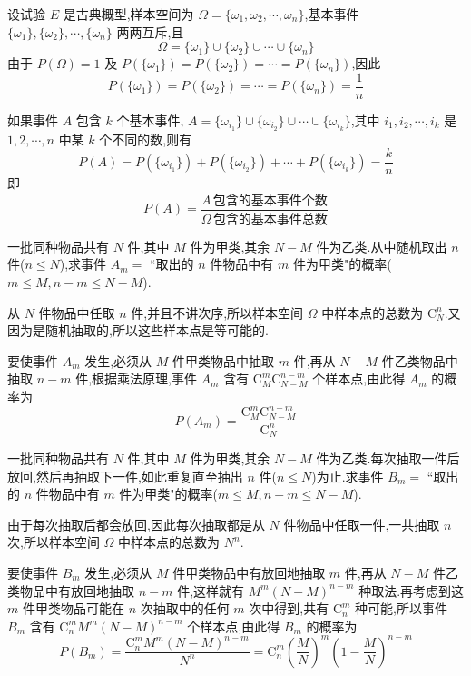 设试验 $E$ 是古典概型,样本空间为 $\varOmega = \{\omega_1,\omega_2,\cdots,\omega_n\}$,基本事件 $\{\omega_1\},\{\omega_2\},\cdots,\{\omega_n\}$ 两两互斥,且
$$
\varOmega = \{\omega_1\} \cup \{\omega_2\} \cup \cdots \cup \{\omega_n\}
$$
由于 $P(\varOmega)=1$ 及 $P(\{\omega_1\})=P(\{\omega_2\})=\cdots=P(\{\omega_n\})$,因此
$$
P(\{\omega_1\})=P(\{\omega_2\})=\cdots=P(\{\omega_n\})=\dfrac{1}{n}
$$

如果事件 $A$ 包含 $k$ 个基本事件, $A=\{\omega_{i_1}\} \cup \{\omega_{i_2}\} \cup \cdots \cup \{\omega_{i_k}\}$,其中 $i_1,i_2,\cdots,i_k$ 是 $1,2,\cdots,n$ 中某 $k$ 个不同的数,则有
$$
P(A) = P(\{\omega_{i_1}\}) + P(\{\omega_{i_2}\}) + \cdots + P(\{\omega_{i_k}\}) = \dfrac{k}{n}
$$
即
$$
P(A)=\dfrac{A\,\text{包含的基本事件个数}}{\varOmega\,\text{包含的基本事件总数}}
$$

\begin{example}[][不放回抽样]
    \indent 一批同种物品共有 $N$ 件,其中 $M$ 件为甲类,其余 $N-M$ 件为乙类.从中随机取出 $n$ 件($n \leqslant N$),求事件 $A_m=$ ``取出的 $n$ 件物品中有 $m$ 件为甲类"的概率($m \leqslant M, n-m \leqslant N-M$).
\end{example}

\begin{solution}
    从 $N$ 件物品中任取 $n$ 件,并且不讲次序,所以样本空间 $\varOmega$ 中样本点的总数为 $\mathrm{C}_N^n$.又因为是随机抽取的,所以这些样本点是等可能的.

    要使事件 $A_m$ 发生,必须从 $M$ 件甲类物品中抽取 $m$ 件,再从 $N-M$ 件乙类物品中抽取 $n-m$ 件,根据乘法原理,事件 $A_m$ 含有 $\mathrm{C}_M^m \mathrm{C}_{N-M}^{n-m}$ 个样本点,由此得 $A_m$ 的概率为
    $$
    P(A_m) = \dfrac{\mathrm{C}_M^m \mathrm{C}_{N-M}^{n-m}}{\mathrm{C}_N^n}
    $$
\end{solution}

\begin{example}[][放回抽样]
    \indent 一批同种物品共有 $N$ 件,其中 $M$ 件为甲类,其余 $N-M$ 件为乙类.每次抽取一件后放回,然后再抽取下一件,如此重复直至抽出 $n$ 件($n \leqslant N$)为止.求事件 $B_m=$ ``取出的 $n$ 件物品中有 $m$ 件为甲类"的概率($m \leqslant M, n-m \leqslant N-M$).
\end{example}

\begin{solution}
    由于每次抽取后都会放回,因此每次抽取都是从 $N$ 件物品中任取一件,一共抽取 $n$ 次,所以样本空间 $\varOmega$ 中样本点的总数为 $N^n$.

    要使事件 $B_m$ 发生,必须从 $M$ 件甲类物品中有放回地抽取 $m$ 件,再从 $N-M$ 件乙类物品中有放回地抽取 $n-m$ 件,这样就有 $M^m (N-M)^{n-m}$ 种取法.再考虑到这 $m$ 件甲类物品可能在 $n$ 次抽取中的任何 $m$ 次中得到,共有 $\mathrm{C}_n^m$ 种可能,所以事件 $B_m$ 含有 $\mathrm{C}_n^m M^m (N-M)^{n-m}$ 个样本点,由此得 $B_m$ 的概率为
    $$
    P(B_m) = \dfrac{\mathrm{C}_n^m M^m (N-M)^{n-m}}{N^n} = \mathrm{C}_n^m \left( \dfrac{M}{N} \right)^m \left( 1 - \dfrac{M}{N} \right)^{n-m}
    $$
\end{solution}

